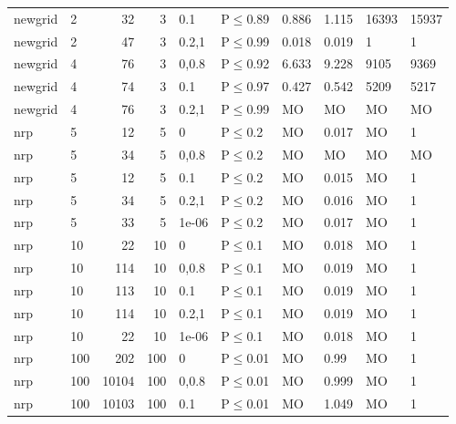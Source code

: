 \begin{longtable}{llrrllllll}
 newgrid       & 2        &     	32 &   3 & 0.1   & P$\leq$0.89  & 0.886    & 1.115    & 16393   & 15937   \\
 newgrid       & 2        &     	47 &   3 & 0.2,1 & P$\leq$0.99  & 0.018    & 0.019    & 1       & 1       \\
 newgrid       & 4        &     	76 &   3 & 0,0.8 & P$\leq$0.92  & 6.633    & 9.228    & 9105    & 9369    \\
 newgrid       & 4        &     	74 &   3 & 0.1   & P$\leq$0.97  & 0.427    & 0.542    & 5209    & 5217    \\
 newgrid       & 4        &     	76 &   3 & 0.2,1 & P$\leq$0.99  & MO       & MO       & MO      & MO      \\
 nrp           & 5        &     	12 &   5 & 0     & P$\leq$0.2   & MO       & 0.017    & MO      & 1       \\
 nrp           & 5        &     	34 &   5 & 0,0.8 & P$\leq$0.2   & MO       & MO       & MO      & MO      \\
 nrp           & 5        &     	12 &   5 & 0.1   & P$\leq$0.2   & MO       & 0.015    & MO      & 1       \\
 nrp           & 5        &     	34 &   5 & 0.2,1 & P$\leq$0.2   & MO       & 0.016    & MO      & 1       \\
 nrp           & 5        &     	33 &   5 & 1e-06 & P$\leq$0.2   & MO       & 0.017    & MO      & 1       \\
 nrp           & 10       &     	22 &  10 & 0     & P$\leq$0.1   & MO       & 0.018    & MO      & 1       \\
 nrp           & 10       &    	114 &  10 & 0,0.8 & P$\leq$0.1   & MO       & 0.019    & MO      & 1       \\
 nrp           & 10       &    	113 &  10 & 0.1   & P$\leq$0.1   & MO       & 0.019    & MO      & 1       \\
 nrp           & 10       &    	114 &  10 & 0.2,1 & P$\leq$0.1   & MO       & 0.019    & MO      & 1       \\
 nrp           & 10       &     	22 &  10 & 1e-06 & P$\leq$0.1   & MO       & 0.018    & MO      & 1       \\
 nrp           & 100      &    	202 & 100 & 0     & P$\leq$0.01  & MO       & 0.99     & MO      & 1       \\
 nrp           & 100      &  	10104 & 100 & 0,0.8 & P$\leq$0.01  & MO       & 0.999    & MO      & 1       \\
 nrp           & 100      &  	10103 & 100 & 0.1   & P$\leq$0.01  & MO       & 1.049    & MO      & 1       \\

\end{longtable}
